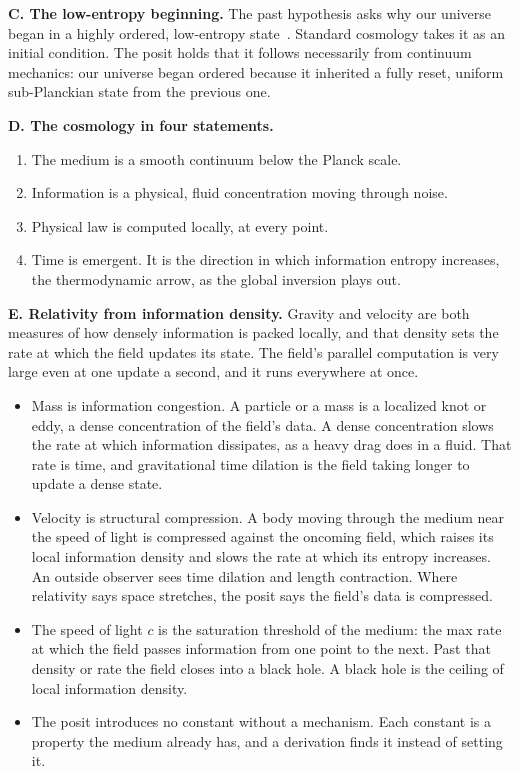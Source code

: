 \textbf{C. The low-entropy beginning.} The past hypothesis asks why our universe began in a highly
ordered, low-entropy state~\cite{src:Albert-2000}. Standard cosmology takes it as an initial
condition. The posit holds that it follows necessarily from continuum mechanics: our universe began
ordered because it inherited a fully reset, uniform sub-Planckian state from the previous one.

\textbf{D. The cosmology in four statements.}
\begin{enumerate}
\item The medium is a smooth continuum below the Planck scale.
\item Information is a physical, fluid concentration moving through noise.
\item Physical law is computed locally, at every point.
\item Time is emergent. It is the direction in which information entropy increases, the
thermodynamic arrow, as the global inversion plays out.
\end{enumerate}

\textbf{E. Relativity from information density.} Gravity and velocity are both measures of how densely
information is packed locally, and that density sets the rate at which the field updates its state.
The field's parallel computation is very large even at one update a second, and it runs everywhere at
once.

\begin{itemize}
\item Mass is information congestion. A particle or a mass is a localized knot or eddy, a dense
concentration of the field's data. A dense concentration slows the rate at which information
dissipates, as a heavy drag does in a fluid. That rate is time, and gravitational time dilation is the
field taking longer to update a dense state.

\item Velocity is structural compression. A body moving through the medium near the speed of light is
compressed against the oncoming field, which raises its local information density and slows the rate
at which its entropy increases. An outside observer sees time dilation and length contraction. Where
relativity says space stretches, the posit says the field's data is compressed.

\item The speed of light $c$ is the saturation threshold of the medium: the max rate at which the
field passes information from one point to the next. Past that density or rate the field closes into a
black hole. A black hole is the ceiling of local information density.

\item The posit introduces no constant without a mechanism. Each constant is a property the medium
already has, and a derivation finds it instead of setting it.
\end{itemize}

